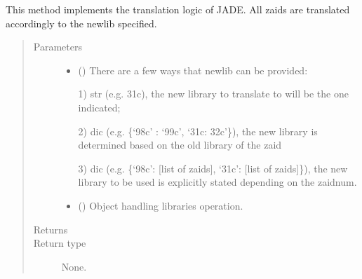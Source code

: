 \documentclass[letterpaper,10pt,english]{sphinxmanual}
\begin{document}
\begin{fulllineitems}
\begin{fulllineitems}
\end{fulllineitems}


\begin{fulllineitems}
\label{\detokenize{api/inputgeneration:matreader.SubMaterial.translate}}
This method implements the translation logic of JADE. All zaids are
translated accordingly to the newlib specified.
\begin{quote}\begin{description}
\item[{Parameters}] \leavevmode\begin{itemize}
\item {} 
 () \textendash{} 
There are a few ways that newlib can be provided:

1) str (e.g. 31c), the new library to translate to will be the
one indicated;

2) dic (e.g. \{‘98c’ : ‘99c’, ‘31c: 32c’\}), the new library is
determined based on the old library of the zaid

3) dic (e.g. \{‘98c’: {[}list of zaids{]}, ‘31c’: {[}list of zaids{]}\}),
the new library to be used is explicitly stated depending
on the zaidnum.


\item {} 
 ({\hyperref[\detokenize{api/initobjects:libmanager.LibManager}]{}}) \textendash{} Object handling libraries operation.

\end{itemize}

\item[{Returns}] \leavevmode


\item[{Return type}] \leavevmode
None.

\end{description}\end{quote}

\end{fulllineitems}


\end{fulllineitems}
\end{document}
